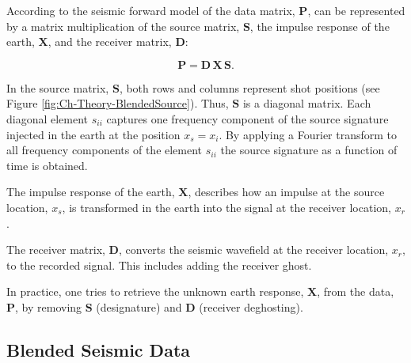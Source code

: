 According to the seismic forward model of \citet{Berkhout1982} the data matrix, $\mathbf{P}$, can be represented by a matrix multiplication of the source matrix, $\mathbf{S}$, the impulse response of the earth, $\mathbf{X}$, and the receiver matrix, $\mathbf{D}$:

\begin{equation}
	\mathbf{P} = \mathbf{D \, X \, S}.
	\label{eq:Ch-Theory-DataRepresentation}
\end{equation}

In the source matrix, $\mathbf{S}$, both rows and columns represent shot positions (see Figure \ref{fig:Ch-Theory-BlendedSource}). Thus, $\mathbf{S}$ is a diagonal matrix. Each diagonal element $s_{ii}$ captures one frequency component of the source signature injected in the earth at the position $x_s = x_i$. By applying a Fourier transform to all frequency components of the element $s_{ii}$ the source signature as a function of time is obtained.

The impulse response of the earth, $\mathbf{X}$, describes how an impulse at the source location, $x_s$, is transformed in the earth into the signal at the receiver location, $x_r$.

The receiver matrix, $\mathbf{D}$, converts the seismic wavefield at the receiver location, $x_r$, to the recorded signal. This includes adding the receiver ghost.

In practice, one tries to retrieve the unknown earth response, $\mathbf{X}$, from the data, $\mathbf{P}$, by removing $\mathbf{S}$ (designature) and $\mathbf{D}$ (receiver deghosting).



\subsection{Blended Seismic Data}

